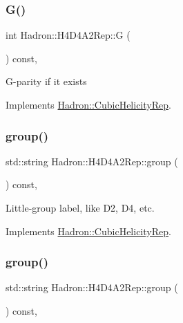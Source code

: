 \subsubsection{\texorpdfstring{G()}{G()}\hspace{0.1cm}{\footnotesize\ttfamily [3/3]}}
{\footnotesize\ttfamily int Hadron\+::\+H4\+D4\+A2\+Rep\+::G (\begin{DoxyParamCaption}{ }\end{DoxyParamCaption}) const\hspace{0.3cm}{\ttfamily [inline]}, {\ttfamily [virtual]}}

G-\/parity if it exists 

Implements \mbox{\hyperlink{structHadron_1_1CubicHelicityRep_a50689f42be1e6170aa8cf6ad0597018b}{Hadron\+::\+Cubic\+Helicity\+Rep}}.

\mbox{\label{structHadron_1_1H4D4A2Rep_a84c4465f2963fe5e6d241882ff28ddae}} 
\subsubsection{\texorpdfstring{group()}{group()}\hspace{0.1cm}{\footnotesize\ttfamily [1/5]}}
{\footnotesize\ttfamily std\+::string Hadron\+::\+H4\+D4\+A2\+Rep\+::group (\begin{DoxyParamCaption}{ }\end{DoxyParamCaption}) const\hspace{0.3cm}{\ttfamily [inline]}, {\ttfamily [virtual]}}

Little-\/group label, like D2, D4, etc. 

Implements \mbox{\hyperlink{structHadron_1_1CubicHelicityRep_a101a7d76cd8ccdad0f272db44b766113}{Hadron\+::\+Cubic\+Helicity\+Rep}}.

\mbox{\label{structHadron_1_1H4D4A2Rep_a84c4465f2963fe5e6d241882ff28ddae}} 
\subsubsection{\texorpdfstring{group()}{group()}\hspace{0.1cm}{\footnotesize\ttfamily [2/5]}}
{\footnotesize\ttfamily std\+::string Hadron\+::\+H4\+D4\+A2\+Rep\+::group (\begin{DoxyParamCaption}{ }\end{DoxyParamCaption}) const\hspace{0.3cm}{\ttfamily [inline]}, {\ttfamily [virtual]}}

